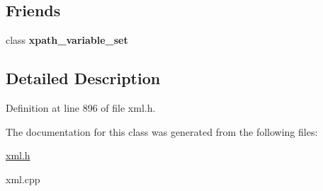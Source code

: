 \subsection*{Friends}
\begin{DoxyCompactItemize}
\item 
\hypertarget{classphys_1_1xml_1_1xpath__variable_ae065e6f4380a8a530c7352703c09ff80}{
class {\bfseries xpath\_\-variable\_\-set}}
\label{d8/d2c/classphys_1_1xml_1_1xpath__variable_ae065e6f4380a8a530c7352703c09ff80}

\end{DoxyCompactItemize}


\subsection{Detailed Description}


Definition at line 896 of file xml.h.



The documentation for this class was generated from the following files:\begin{DoxyCompactItemize}
\item 
\hyperlink{xml_8h}{xml.h}\item 
xml.cpp\end{DoxyCompactItemize}
